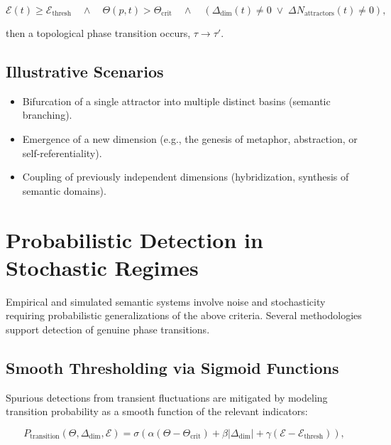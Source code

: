 \begin{equation}
\mathcal{E}(t) \geq \mathcal{E}_{\text{thresh}} \quad \wedge \quad \Theta(p,t) > \Theta_{\text{crit}} \quad \wedge \quad \left(\Delta_{\text{dim}}(t) \neq 0 \;\vee\; \Delta N_{\text{attractors}}(t) \neq 0\right),
\end{equation}

then a topological phase transition occurs, \(\tau \rightarrow \tau'\).

\subsection{Illustrative Scenarios}

\begin{itemize}
    \item Bifurcation of a single attractor into multiple distinct basins (semantic branching).
    \item Emergence of a new dimension (e.g., the genesis of metaphor, abstraction, or self-referentiality).
    \item Coupling of previously independent dimensions (hybridization, synthesis of semantic domains).
\end{itemize}

\section{Probabilistic Detection in Stochastic Regimes}

Empirical and simulated semantic systems involve noise and stochasticity requiring probabilistic generalizations of the above criteria. Several methodologies support detection of genuine phase transitions.

\subsection{Smooth Thresholding via Sigmoid Functions}

Spurious detections from transient fluctuations are mitigated by modeling transition probability as a smooth function of the relevant indicators:

\begin{equation}
P_{\text{transition}}(\Theta, \Delta_{\text{dim}}, \mathcal{E}) = \sigma\left(\alpha(\Theta - \Theta_{\text{crit}}) + \beta|\Delta_{\text{dim}}| + \gamma(\mathcal{E} - \mathcal{E}_{\text{thresh}})\right),
\end{equation}

